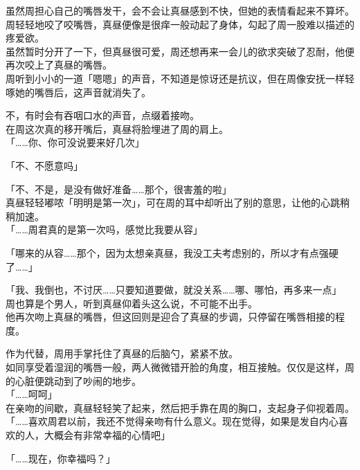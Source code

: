 虽然周担心自己的嘴唇发干，会不会让真昼感到不快，但她的表情看起来不算坏。周轻轻地咬了咬嘴唇，真昼便像是很痒一般动起了身体，勾起了周一股难以描述的疼爱欲。\\

虽然暂时分开了一下，但真昼很可爱，周还想再来一会儿的欲求突破了忍耐，他便再次咬上了真昼的嘴唇。\\

周听到小小的一道「嗯嗯」的声音，不知道是惊讶还是抗议，但在周像安抚一样轻啄她的嘴唇后，这声音就消失了。

不，有时会有吞咽口水的声音，点缀着接吻。\\

在周这次真的移开嘴后，真昼将脸埋进了周的肩上。\\

「……你、你可没说要来好几次」

「不、不愿意吗」

「不、不是，是没有做好准备……那个，很害羞的啦」\\

真昼轻轻嘟哝「明明是第一次」，可在周的耳中却听出了别的意思，让他的心跳稍稍加速。\\

「……周君真的是第一次吗，感觉比我要从容」

「哪来的从容……那个，因为太想亲真昼，我没工夫考虑别的，所以才有点强硬了……」

「我、我倒也，不讨厌……只要知道要做，就没关系……哪、哪怕，再多来一点」\\

周也算是个男人，听到真昼仰着头这么说，不可能不出手。\\

他再次吻上真昼的嘴唇，但这回则是迎合了真昼的步调，只停留在嘴唇相接的程度。

作为代替，周用手掌托住了真昼的后脑勺，紧紧不放。\\

如同享受着湿润的嘴唇一般，两人微微错开脸的角度，相互接触。仅仅是这样，周的心脏便跳动到了吵闹的地步。\\

「……呵呵」\\

在亲吻的间歇，真昼轻轻笑了起来，然后把手靠在周的胸口，支起身子仰视着周。\\

「……喜欢周君以前，我还不觉得亲吻有什么意义。现在觉得，如果是发自内心喜欢的人，大概会有非常幸福的心情吧」

「……现在，你幸福吗？」

